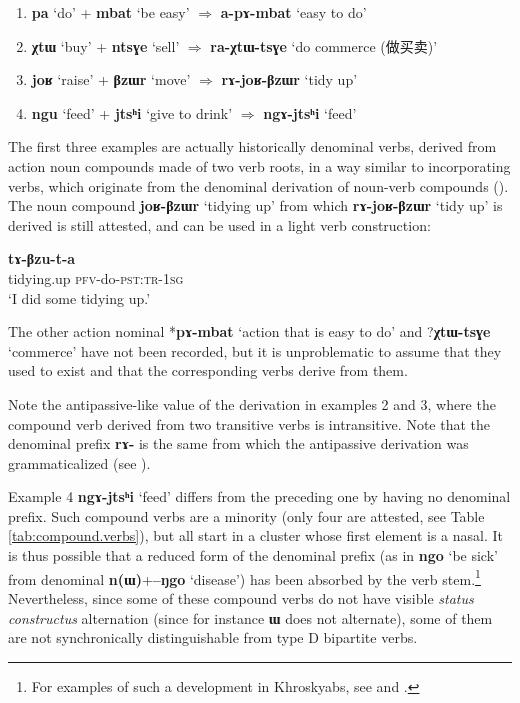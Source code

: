 \documentclass[oneside,a4paper,11pt]{article}
\newcommand{\ipa}[1]{{\phon\textbf{#1}}}
\newcommand{\zh}[1]{{\cn #1}}
\newcommand{\jpg}[2]{\ipa{#1} `#2'}
\begin{document}
\begin{enumerate}
\item \jpg{pa}{do} + \jpg{mbat}{be easy} $\Rightarrow$ \jpg{a-pɤ-mbat}{easy to do}
\item \jpg{χtɯ}{buy} + \jpg{ntsɣe}{sell} $\Rightarrow$ \jpg{ra-χtɯ-tsɣe}{do commerce (\zh{做买卖})} 
\item \jpg{joʁ}{raise} + \jpg{βzɯr}{move}   $\Rightarrow$  \jpg{rɤ-joʁ-βzɯr}{tidy up}
\item \jpg{ngu}{feed} + \jpg{jtsʰi}{give to drink} $\Rightarrow$ \jpg{ngɤ-jtsʰi}{feed}
\end{enumerate}

The first three examples are actually historically denominal verbs, derived from action noun compounds made of two verb roots, in a way similar to incorporating verbs, which originate from the denominal derivation of noun-verb compounds (\citealt{jacques12incorp}). The noun compound \jpg{joʁ-βzɯr}{tidying up} from which \jpg{rɤ-joʁ-βzɯr}{tidy up} is derived is still attested, and can be used in a light verb construction:

\begin{exe}
\ex 
 \gll \ipa{joʁβzɯr} \ipa{tɤ-βzu-t-a} \\
 tidying.up \textsc{pfv}-do-\textsc{pst:tr-1sg} \\
 \glt `I did some tidying up.'
\end{exe}

The other action nominal *\ipa{pɤ-mbat} `action that is easy to do' and ?\ipa{χtɯ-tsɣe} `commerce' have not been recorded, but it is unproblematic to assume that they used to exist and that the corresponding verbs derive from them.

Note the antipassive-like value of the derivation in examples 2 and 3, where the compound verb derived from two transitive verbs is intransitive. Note that the denominal prefix \ipa{rɤ-} is the same from which the antipassive derivation was grammaticalized (see  \citealt{jacques14antipassive}).

Example 4 \jpg{ngɤ-jtsʰi}{feed} differs from the preceding one by having no denominal prefix. Such compound verbs are a minority (only four are attested, see Table \ref{tab:compound.verbs}), but all start in a cluster whose first element is a nasal. It is thus possible that a reduced form of the denominal prefix (as in \jpg{ngo}{be sick} from denominal \ipa{n(ɯ)}+\jpg{--ŋgo}{disease}) has been absorbed by the verb stem.\footnote{For examples of such a development in Khroskyabs, see \citet{jacques12incorp} and \citealt{lai13affixale}. } Nevertheless, since some of these compound verbs do not have visible \textit{status constructus} alternation (since for instance \ipa{ɯ} does not alternate), some of them are not synchronically distinguishable from type D bipartite verbs.
\end{document}
